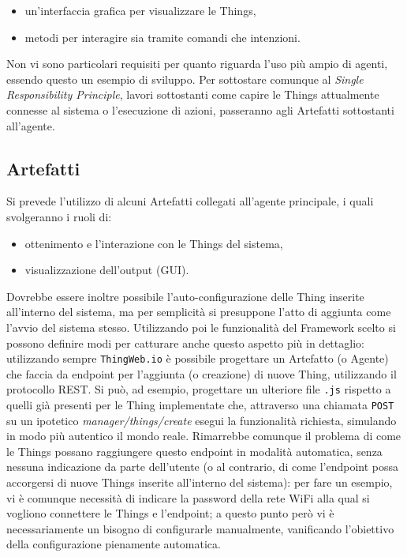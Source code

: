 \documentclass[12pt,a4paper,openright,oneside]{report}
\begin{document}
\begin{itemize}
	\setlength\itemsep{-0.3em}
	\item un'interfaccia grafica per visualizzare le Things,
	\item metodi per interagire sia tramite comandi che intenzioni.
\end{itemize}

Non vi sono particolari requisiti per quanto riguarda l'uso più ampio di agenti, essendo questo un esempio di sviluppo. Per sottostare comunque al \textit{Single Responsibility Principle}, lavori sottostanti come capire le Things attualmente connesse al sistema o l'esecuzione di azioni, passeranno agli Artefatti sottostanti all'agente.

\subsection{Artefatti}
Si prevede l'utilizzo di alcuni Artefatti collegati all'agente principale, i quali svolgeranno i ruoli di:

\begin{itemize}
	\setlength\itemsep{-0.3em}
	\item ottenimento e l'interazione con le Things del sistema,
	\item visualizzazione dell'output (GUI).
\end{itemize}

Dovrebbe essere inoltre possibile l'auto-configurazione delle Thing inserite all'interno del sistema, ma per semplicità si presuppone l'atto di aggiunta come l'avvio del sistema stesso. Utilizzando poi le funzionalità del Framework scelto si possono definire modi per catturare anche questo aspetto più in dettaglio: utilizzando sempre \texttt{ThingWeb.io} è possibile progettare un Artefatto (o Agente) che faccia da endpoint per l'aggiunta (o creazione) di nuove Thing, utilizzando il protocollo REST. Si può, ad esempio, progettare un ulteriore file \texttt{.js} rispetto a quelli già presenti per le Thing implementate che, attraverso una chiamata \texttt{POST} su un ipotetico \textit{manager/things/create} esegui la funzionalità richiesta, simulando in modo più autentico il mondo reale. Rimarrebbe comunque il problema di come le Things possano raggiungere questo endpoint in modalità automatica, senza nessuna indicazione da parte dell'utente (o al contrario, di come l'endpoint possa accorgersi di nuove Things inserite all'interno del sistema): per fare un esempio, vi è comunque necessità di indicare la password della rete WiFi alla qual si vogliono connettere le Things e l'endpoint; a questo punto però vi è necessariamente un bisogno di configurarle manualmente, vanificando l'obiettivo della configurazione pienamente automatica.\\
\end{document}
